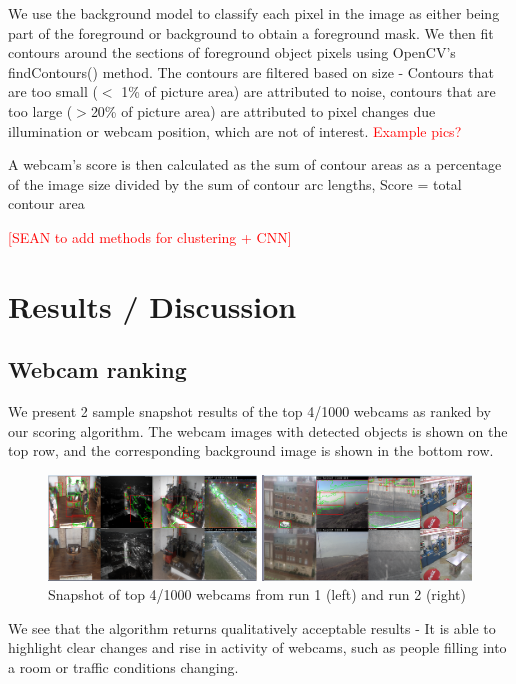 \documentclass[10pt]{article} %
\begin{document}
We use the background model to classify each pixel in the image as either being part of the foreground or background to obtain a foreground mask. We then fit contours around the sections of foreground object pixels using OpenCV's findContours() method. The contours are filtered based on size - Contours that are too small ($<$ 1\% of picture area) are attributed to noise, contours that are too large ($>$20\% of picture area) are attributed to pixel changes due illumination or webcam position, which are not of interest. \textcolor{red}{Example pics?}

A webcam's score is then calculated as the sum of contour areas as a percentage of the image size divided by the sum of contour arc lengths, Score = total contour area %

\textcolor{red}{[SEAN to add methods for clustering + CNN]}

\section{Results / Discussion}
\subsection{Webcam ranking}
We present 2 sample snapshot results of the top 4/1000 webcams as ranked by our scoring algorithm. The webcam images with detected objects is shown on the top row, and the corresponding background image is shown in the bottom row. 
\begin{figure}[H]
\centering
\caption{Snapshot of top 4/1000 webcams from run 1 (left) and run 2 (right)}
\includegraphics[scale = 0.5]{wc}
\end{figure}
We see that the algorithm returns qualitatively acceptable results - It is able to highlight clear changes and rise in activity of webcams, such as people filling into a room or traffic conditions changing. 
\end{document}
